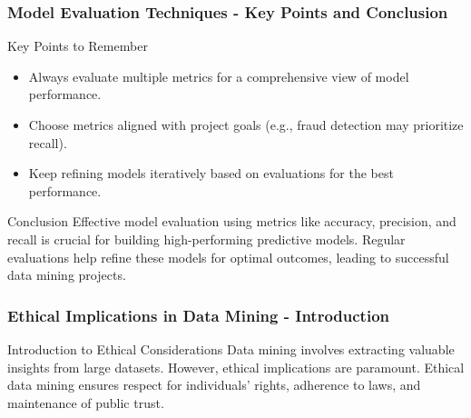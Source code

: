 \documentclass[aspectratio=169]{beamer}
\begin{document}
\begin{frame}[fragile]
    \frametitle{Model Evaluation Techniques - Key Points and Conclusion}
    \begin{block}{Key Points to Remember}
        \begin{itemize}
            \item Always evaluate multiple metrics for a comprehensive view of model performance.
            \item Choose metrics aligned with project goals (e.g., fraud detection may prioritize recall).
            \item Keep refining models iteratively based on evaluations for the best performance.
        \end{itemize}
    \end{block}

    \begin{block}{Conclusion}
        Effective model evaluation using metrics like accuracy, precision, and recall is crucial for building high-performing predictive models. Regular evaluations help refine these models for optimal outcomes, leading to successful data mining projects.
    \end{block}
\end{frame}

\begin{frame}[fragile]
    \frametitle{Ethical Implications in Data Mining - Introduction}
    \begin{block}{Introduction to Ethical Considerations}
        Data mining involves extracting valuable insights from large datasets. However, ethical implications are paramount. 
        Ethical data mining ensures respect for individuals' rights, adherence to laws, and maintenance of public trust.
    \end{block}
\end{frame}
\end{document}
